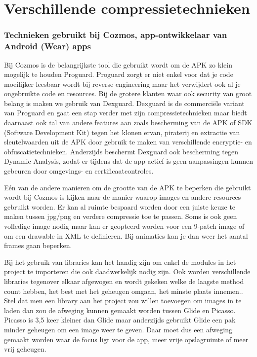 \section{Verschillende compressietechnieken}
\label{sec:compressietechnieken}

\subsubsection{Technieken gebruikt bij Cozmos, app-ontwikkelaar van Android (Wear) apps}
Bij Cozmos is de belangrijkste tool die gebruikt wordt om de APK zo klein mogelijk te houden Proguard. Proguard zorgt er niet enkel voor dat je code moeilijker leesbaar wordt bij reverse engineering maar het verwijdert ook al je ongebruikte code en resources.
Bij de grotere klanten waar ook security van groot belang is maken we gebruik van Dexguard. Dexguard is de commerciële variant van Proguard en gaat een stap verder met zijn compressietechnieken maar biedt daarnaast ook tal van andere features aan zoals bescherming van de APK of SDK (Software Development Kit) tegen het klonen ervan, piraterij en extractie van sleutelwaarden uit de APK door gebruik te maken van verschillende encryptie- en obfuscatietechnieken. Anderzijds beschermt Dexguard ook bescherming tegen Dynamic Analysis, zodat er tijdens dat de app actief is geen aanpassingen kunnen gebeuren door omgevings- en certificaatcontroles. 

Eén van de andere manieren om de grootte van de APK te beperken die gebruikt wordt bij Cozmos is kijken naar de manier waarop images en andere resources gebruikt worden. Er kan al ruimte bespaard worden door een juiste keuze te maken tussen jpg/png en verdere compressie toe te passen. Soms is ook geen volledige image nodig maar kan er geopteerd worden voor een 9-patch image of om een drawable in XML te definieren. Bij animaties kan je dan weer het aantal frames gaan beperken.

Bij het gebruik van libraries kan het handig zijn om enkel de modules in het project te importeren die ook daadwerkelijk nodig zijn. Ook worden verschillende libraries tegenover elkaar afgewogen en wordt gekeken welke de laagste method count hebben, het best met het geheugen omgaan, het minste plaats innemen.. Stel dat men een library aan het project zou willen toevoegen om images in te laden dan zou de afweging kunnen gemaakt worden tussen Glide en Picasso. Picasso is 3,5 keer kleiner dan Glide maar anderzijds gebruikt Glide een pak minder geheugen om een image weer te geven. Daar moet dus een afweging gemaakt worden waar de focus ligt voor de app, meer vrije opslagruimte of meer vrij geheugen.


